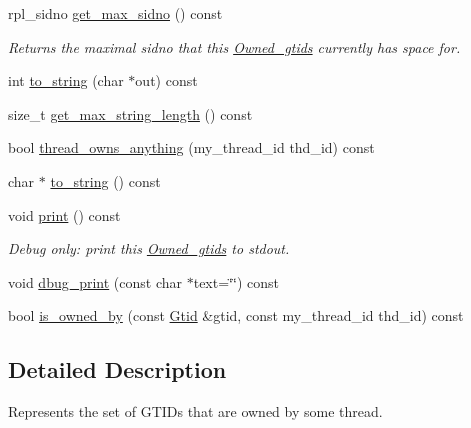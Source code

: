 \begin{DoxyCompactItemize}
\mbox{\label{classOwned__gtids_a87a9e66aa429f4d562c24623bd113093}} 
rpl\+\_\+sidno \mbox{\hyperlink{classOwned__gtids_a87a9e66aa429f4d562c24623bd113093}{get\+\_\+max\+\_\+sidno}} () const
\begin{DoxyCompactList}\small\item\em Returns the maximal sidno that this \mbox{\hyperlink{classOwned__gtids}{Owned\+\_\+gtids}} currently has space for. \end{DoxyCompactList}\item 
int \mbox{\hyperlink{classOwned__gtids_a746e2bc47416a49a418fa6dd0abb8421}{to\+\_\+string}} (char $\ast$out) const
\item 
size\+\_\+t \mbox{\hyperlink{classOwned__gtids_a0d71e2cdcab169bbe86b9f6067b1c93a}{get\+\_\+max\+\_\+string\+\_\+length}} () const
\item 
bool \mbox{\hyperlink{classOwned__gtids_a2dc24132eb1138e5c291da8db213e47c}{thread\+\_\+owns\+\_\+anything}} (my\+\_\+thread\+\_\+id thd\+\_\+id) const
\item 
char $\ast$ \mbox{\hyperlink{classOwned__gtids_ad4abec5df6285656ea7f69a4bef7ba79}{to\+\_\+string}} () const
\item 
\mbox{\label{classOwned__gtids_adaa9384e98baaa628266f8d5e6a70c38}} 
void \mbox{\hyperlink{classOwned__gtids_adaa9384e98baaa628266f8d5e6a70c38}{print}} () const
\begin{DoxyCompactList}\small\item\em Debug only\+: print this \mbox{\hyperlink{classOwned__gtids}{Owned\+\_\+gtids}} to stdout. \end{DoxyCompactList}\item 
void \mbox{\hyperlink{classOwned__gtids_aa2aa4bc59310407ed3f5b00db77d0021}{dbug\+\_\+print}} (const char $\ast$text=\char`\"{}\char`\"{}) const
\item 
bool \mbox{\hyperlink{classOwned__gtids_a5a377386748e0fbb46229e097388bf05}{is\+\_\+owned\+\_\+by}} (const \mbox{\hyperlink{structGtid}{Gtid}} \&gtid, const my\+\_\+thread\+\_\+id thd\+\_\+id) const
\end{DoxyCompactItemize}


\subsection{Detailed Description}
Represents the set of G\+T\+I\+Ds that are owned by some thread.

